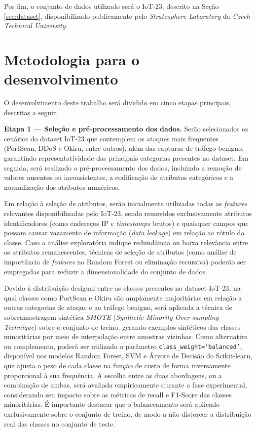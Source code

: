 Por fim, o conjunto de dados utilizado será o IoT-23, descrito na Seção \ref{sec:dataset}, disponibilizado publicamente pelo \textit{Stratosphere Laboratory} da \textit{Czech Technical University}.

\section{Metodologia para o desenvolvimento}

O desenvolvimento deste trabalho será dividido em cinco etapas principais, descritas a seguir.

\textbf{Etapa 1 — Seleção e pré-processamento dos dados.} Serão selecionados os cenários do dataset IoT-23 que contemplem os ataques mais frequentes (PortScan, DDoS e Okiru, entre outros), além das capturas de tráfego benigno, garantindo representatividade das principais categorias presentes no dataset. Em seguida, será realizado o pré-processamento dos dados, incluindo a remoção de valores ausentes ou inconsistentes, a codificação de atributos categóricos e a normalização dos atributos numéricos.

Em relação à seleção de atributos, serão inicialmente utilizadas todas as \textit{features} relevantes disponibilizadas pelo IoT-23, sendo removidos exclusivamente atributos identificadores (como endereços IP e \textit{timestamps} brutos) e quaisquer campos que possam causar vazamento de informação (\textit{data leakage}) em relação ao rótulo da classe. Caso a análise exploratória indique redundância ou baixa relevância entre os atributos remanescentes, técnicas de seleção de atributos (como análise de importância de \textit{features} no Random Forest ou eliminação recursiva) poderão ser empregadas para reduzir a dimensionalidade do conjunto de dados.

Devido à distribuição desigual entre as classes presentes no dataset IoT-23, na qual classes como PortScan e Okiru são amplamente majoritárias em relação a outras categorias de ataque e ao tráfego benigno, será aplicada a técnica de sobreamostragem sintética \textit{SMOTE} (\textit{Synthetic Minority Over-sampling Technique}) sobre o conjunto de treino, gerando exemplos sintéticos das classes minoritárias por meio de interpolação entre amostras vizinhas. Como alternativa ou complemento, poderá ser utilizado o parâmetro \texttt{class\_weight=`balanced'}, disponível nos modelos Random Forest, SVM e Árvore de Decisão do Scikit-learn, que ajusta o peso de cada classe na função de custo de forma inversamente proporcional à sua frequência. A escolha entre as duas abordagens, ou a combinação de ambas, será avaliada empiricamente durante a fase experimental, considerando seu impacto sobre as métricas de recall e F1-Score das classes minoritárias. É importante destacar que o balanceamento será aplicado exclusivamente sobre o conjunto de treino, de modo a não distorcer a distribuição real das classes no conjunto de teste.

